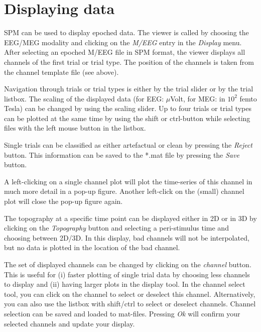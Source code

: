 \section{Displaying data}
SPM can be used to display epoched data. The viewer is called by
choosing the EEG/MEG modality and clicking on the {\it M/EEG} entry in
the {\it Display} menu. After selecting an epoched M/EEG file in SPM
format, the viewer displays all channels of the first trial or trial
type. The position of the channels is taken from the channel template
file (see above). 

Navigation through trials or trial types is either by the trial
slider or by the trial listbox. The scaling of the displayed data (for
EEG: $\mu$Volt, for MEG: in $10^2$ femto Tesla) can be changed by using
the scaling slider. Up to four trials or trial types can be plotted at
the same time by using the shift or ctrl-button while selecting files
with the left mouse button in the listbox.

Single trials can be classified as either artefactual or clean by
pressing the {\it Reject} button. This information can be saved to the
*.mat file by pressing the {\it Save} button.

A left-clicking on a single channel plot will plot the time-series of
this channel in much more detail in a pop-up figure. Another
left-click on the (small) channel plot will close the pop-up figure
again. 

The topography at a specific time point can be displayed either in 2D
or in 3D by clicking on the {\it Topography} button and selecting a
peri-stimulus time and choosing between 2D/3D. In this display, bad
channels will not be interpolated, but no data is plotted in the
location of the bad channel.

The set of displayed channels can be changed by clicking on the {\it
channel} button. This is useful for (i) faster plotting of single
trial data by choosing less channels to display and (ii) having larger
plots in the display tool. In the channel select tool, you can click on
the channel to select or deselect this channel. Alternatively, you can
also use the listbox with shift/ctrl to select or deselect
channels. Channel selection can be saved and loaded to
mat-files. Pressing {\it Ok} will confirm your selected channels and
update your display.

